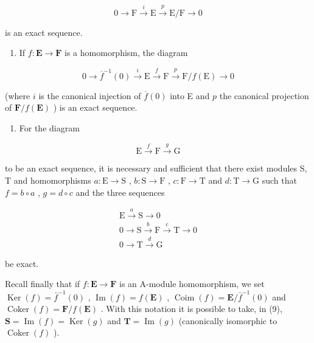 \[
0 \longrightarrow \mathrm{F} \stackrel {i} {\longrightarrow} \mathrm{E} \stackrel {p} {\longrightarrow} \mathrm{E} / \mathrm{F} \longrightarrow 0\tag{6}
\]

is an exact sequence.

\begin{enumerate}
\def\labelenumi{(\alph{enumi})}
\setcounter{enumi}{4}
\tightlist
\item
  If \(f: \mathbf{E} \to \mathbf{F}\) is a homomorphism, the diagram
\end{enumerate}

\[
0 \longrightarrow \overline {{f}} ^ {- 1} (0) \stackrel {i} {\longrightarrow} \mathrm{E} \stackrel {f} {\longrightarrow} \mathrm{F} \stackrel {p} {\longrightarrow} \mathrm{F} / f (\mathrm{E}) \longrightarrow 0\tag{7}
\]

(where \(i\) is the canonical injection of \(\overline{f}(0)\) into E and \(p\) the canonical projection of \(\mathbf{F} / f(\mathbf{E})\) ) is an exact sequence.

\begin{enumerate}
\def\labelenumi{(\alph{enumi})}
\setcounter{enumi}{5}
\tightlist
\item
  For the diagram
\end{enumerate}

\[
\mathrm{E} \xrightarrow {f} \mathrm{F} \xrightarrow {g} \mathrm{G}\tag{8}
\]

to be an exact sequence, it is necessary and sufficient that there exist modules S, T and homomorphisms \(a: \mathrm{E} \to \mathrm{S}\) , \(b: \mathrm{S} \to \mathrm{F}\) , \(c: \mathrm{F} \to \mathrm{T}\) and \(d: \mathrm{T} \to \mathrm{G}\) such that \(f = b \circ a\) , \(g = d \circ c\) and the three sequences

\[
\begin{array}{c} \mathrm{E} \xrightarrow {a} \mathrm{S} \longrightarrow 0 \\ 0 \longrightarrow \mathrm{S} \xrightarrow {b} \mathrm{F} \xrightarrow {c} \mathrm{T} \longrightarrow 0 \\ 0 \longrightarrow \mathrm{T} \xrightarrow {d} \mathrm{G} \end{array}\tag{9}
\]

be exact.

Recall finally that if \(f: \mathbf{E} \to \mathbf{F}\) is an A-module homomorphism, we set \(\operatorname{Ker}(f) = \bar{f}^{-1}(0)\) , \(\operatorname{Im}(f) = f(\mathbf{E})\) , \(\operatorname{Coim}(f) = \mathbf{E} / \bar{f}^{-1}(0)\) and \(\operatorname{Coker}(f) = \mathbf{F} / f(\mathbf{E})\) . With this notation it is possible to take, in (9), \(\mathbf{S} = \operatorname{Im}(f) = \operatorname{Ker}(g)\) and \(\mathbf{T} = \operatorname{Im}(g)\) (canonically isomorphic to \(\operatorname{Coker}(f)\) ).

